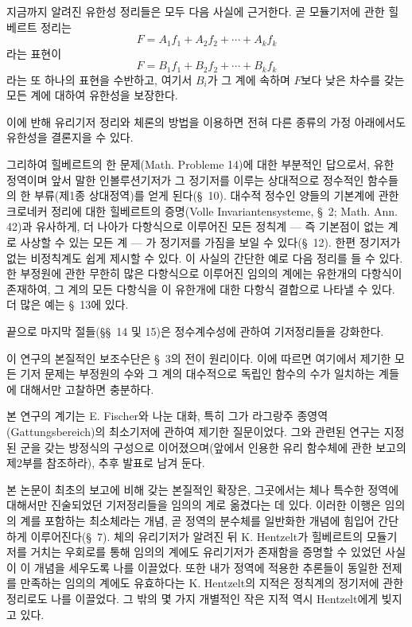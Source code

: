 지금까지 알려진 유한성 정리들은 모두 다음 사실에 근거한다. 곧 모듈기저에 관한 힐베르트 정리는
\[
  F=A_1f_1+A_2f_2+\cdots+A_kf_k
\]
라는 표현이
\[
  F=B_1f_1+B_2f_2+\cdots+B_kf_k
\]
라는 또 하나의 표현을 수반하고, 여기서 $B_i$가 그 계에 속하며 $F$보다 낮은 차수를 갖는 모든 계에 대하여 유한성을 보장한다.

이에 반해 유리기저 정리와 체론의 방법을 이용하면 전혀 다른 종류의 가정 아래에서도 유한성을 결론지을 수 있다.

그리하여 힐베르트의 한 문제(Math. Probleme 14)에 대한 부분적인 답으로서, 유한 정역이며 앞서 말한 인볼루션기저가 그 정기저를 이루는 상대적으로 정수적인 함수들의 한 부류(제1종 상대정역)를 얻게 된다(\S\ 10). 대수적 정수인 양들의 기본계에 관한 크로네커 정리에 대한 힐베르트의 증명(Volle Invariantensysteme, \S\ 2; Math. Ann. 42)과 유사하게, 더 나아가 다항식으로 이루어진 모든 정칙계 --- 즉 기본점이 없는 계로 사상할 수 있는 모든 계 --- 가 정기저를 가짐을 보일 수 있다(\S\ 12). 한편 정기저가 없는 비정칙계도 쉽게 제시할 수 있다. 이 사실의 간단한 예로 다음 정리를 들 수 있다. \glqq{}한 부정원에 관한 무한히 많은 다항식으로 이루어진 임의의 계에는 유한개의 다항식이 존재하여, 그 계의 모든 다항식을 이 유한개에 대한 다항식 결합으로 나타낼 수 있다.\grqq{} 더 많은 예는 \S\ 13에 있다.

끝으로 마지막 절들(\S\S\ 14 및 15)은 정수계수성에 관하여 기저정리들을 강화한다.

이 연구의 본질적인 보조수단은 \S\ 3의 전이 원리이다. 이에 따르면 여기에서 제기한 모든 기저 문제는 부정원의 수와 그 계의 대수적으로 독립인 함수의 수가 일치하는 계들에 대해서만 고찰하면 충분하다.

본 연구의 계기는 E. Fischer와 나눈 대화, 특히 그가 라그랑주 종영역(Gattungsbereich)의 최소기저에 관하여 제기한 질문이었다. 그와 관련된 연구는 지정된 군을 갖는 방정식의 구성으로 이어졌으며(앞에서 인용한 \glqq{}유리 함수체\grqq{}에 관한 보고의 제2부를 참조하라), 추후 발표로 남겨 둔다.

본 논문이 최초의 보고에 비해 갖는 본질적인 확장은, 그곳에서는 체나 특수한 정역에 대해서만 진술되었던 기저정리들을 임의의 계로 옮겼다는 데 있다. 이러한 이행은 임의의 계를 포함하는 최소체라는 개념, 곧 정역의 분수체를 일반화한 개념에 힘입어 간단하게 이루어진다(\S\ 7). 체의 유리기저가 알려진 뒤 K. Hentzelt가 힐베르트의 모듈기저를 거치는 우회로를 통해 임의의 계에도 유리기저가 존재함을 증명할 수 있었던 사실이 이 개념을 세우도록 나를 이끌었다. 또한 내가 정역에 적용한 추론들이 동일한 전제를 만족하는 임의의 계에도 유효하다는 K. Hentzelt의 지적은 정칙계의 정기저에 관한 정리로도 나를 이끌었다. 그 밖의 몇 가지 개별적인 작은 지적 역시 Hentzelt에게 빚지고 있다.

